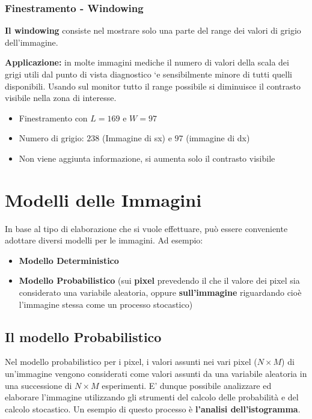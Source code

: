 \subsubsection{Finestramento - Windowing}

\begin{definition}
    \textbf{Il windowing} consiste nel mostrare solo una parte del range dei valori di grigio dell’immagine.
\end{definition}

\textbf{Applicazione:} in molte immagini mediche il numero di valori della
scala dei grigi utili dal punto di vista diagnostico `e sensibilmente
minore di tutti quelli disponibili. Usando sul monitor tutto il range
possibile si diminuisce il contrasto visibile nella zona di interesse.

\begin{itemize}
    \item Finestramento con $L = 169$ e $W = 97$
    \item Numero di grigio: $238$ (Immagine di sx) e $97$ (immagine di dx)
    \item Non viene aggiunta informazione, si aumenta solo il contrasto visibile
\end{itemize}

\section{Modelli delle Immagini}
In base al tipo di elaborazione che si vuole effettuare, può essere conveniente adottare diversi modelli per le immagini. Ad esempio:

\begin{itemize}
    \item \textbf{Modello Deterministico}
    \item \textbf{Modello Probabilistico} (sui \textbf{pixel} prevedendo il che il valore dei pixel sia considerato una variabile aleatoria,
          oppure \textbf{sull'immagine} riguardando cioè l'immagine stessa come un processo stocastico)
\end{itemize}

\subsection{Il modello Probabilistico}

Nel modello probabilistico per i pixel, i valori assunti nei vari pixel ($N × M$) di un’immagine vengono considerati come valori assunti
da una variabile aleatoria in una successione di $N × M$ esperimenti. E’ dunque possibile analizzare ed elaborare l’immagine utilizzando gli strumenti del calcolo delle probabilità e del calcolo stocastico.
Un esempio di questo processo è \textbf{l’analisi dell’istogramma}.

